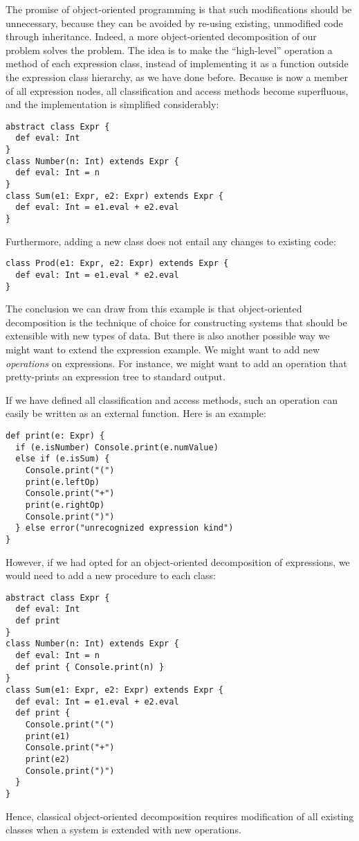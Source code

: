 The promise of object-oriented programming is that such modifications
should be unnecessary, because they can be avoided by re-using
existing, unmodified code through inheritance. Indeed, a more
object-oriented decomposition of our problem solves the problem.  The
idea is to make the ``high-level'' operation  a method of
each expression class, instead of implementing it as a function
outside the expression class hierarchy, as we have done
before. Because  is now a member of all expression nodes,
all classification and access methods become superfluous, and the implementation is simplified considerably:
\begin{lstlisting}
abstract class Expr {
  def eval: Int
}
class Number(n: Int) extends Expr {
  def eval: Int = n
}
class Sum(e1: Expr, e2: Expr) extends Expr {
  def eval: Int = e1.eval + e2.eval
}
\end{lstlisting}
Furthermore, adding a new  class does not entail any changes to existing code:
\begin{lstlisting}
class Prod(e1: Expr, e2: Expr) extends Expr {
  def eval: Int = e1.eval * e2.eval
}
\end{lstlisting}

The conclusion we can draw from this example is that object-oriented
decomposition is the technique of choice for constructing systems that
should be extensible with new types of data. But there is also another
possible way we might want to extend the expression example. We might
want to add new {\em operations} on expressions.  For instance, we might
want to add an operation that pretty-prints an expression tree to standard output.

If we have defined all classification and access methods, such an
operation can easily be written as an external function. Here is an
example:
\begin{lstlisting}
def print(e: Expr) {
  if (e.isNumber) Console.print(e.numValue)
  else if (e.isSum) {
    Console.print("(")
    print(e.leftOp)
    Console.print("+")
    print(e.rightOp)
    Console.print(")")
  } else error("unrecognized expression kind")
}
\end{lstlisting}
However, if we had opted for an object-oriented decomposition of
expressions, we would need to add a new  procedure
to each class:
\begin{lstlisting}
abstract class Expr {
  def eval: Int
  def print
}
class Number(n: Int) extends Expr {
  def eval: Int = n
  def print { Console.print(n) }
}
class Sum(e1: Expr, e2: Expr) extends Expr {
  def eval: Int = e1.eval + e2.eval
  def print {
    Console.print("(")
    print(e1)
    Console.print("+")
    print(e2)
    Console.print(")")
  }
}
\end{lstlisting}
Hence, classical object-oriented decomposition requires modification
of all existing classes when a system is extended with new operations.

